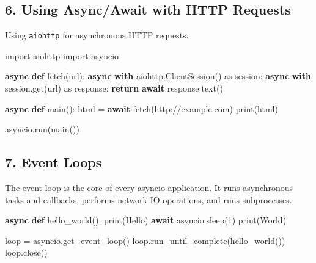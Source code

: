 \documentclass[
  letterpaper,
  DIV=11,
  numbers=noendperiod]{scrreprt}
\newenvironment{Shaded}{\begin{snugshade}}{\end{snugshade}}
\newcommand{\BuiltInTok}[1]{\textcolor[rgb]{0.00,0.23,0.31}{#1}}
\newcommand{\ControlFlowTok}[1]{\textcolor[rgb]{0.00,0.23,0.31}{\textbf{#1}}}
\newcommand{\DecValTok}[1]{\textcolor[rgb]{0.68,0.00,0.00}{#1}}
\newcommand{\ImportTok}[1]{\textcolor[rgb]{0.00,0.46,0.62}{#1}}
\newcommand{\KeywordTok}[1]{\textcolor[rgb]{0.00,0.23,0.31}{\textbf{#1}}}
\newcommand{\NormalTok}[1]{\textcolor[rgb]{0.00,0.23,0.31}{#1}}
\newcommand{\OperatorTok}[1]{\textcolor[rgb]{0.37,0.37,0.37}{#1}}
\newcommand{\StringTok}[1]{\textcolor[rgb]{0.13,0.47,0.30}{#1}}
\begin{document}
\subsection{6. Using Async/Await with HTTP
Requests}\label{using-asyncawait-with-http-requests}

Using \texttt{aiohttp} for asynchronous HTTP requests.

\begin{Shaded}
\begin{Highlighting}[]
\ImportTok{import}\NormalTok{ aiohttp}
\ImportTok{import}\NormalTok{ asyncio}

\ControlFlowTok{async} \KeywordTok{def}\NormalTok{ fetch(url):}
    \ControlFlowTok{async} \ControlFlowTok{with}\NormalTok{ aiohttp.ClientSession() }\ImportTok{as}\NormalTok{ session:}
        \ControlFlowTok{async} \ControlFlowTok{with}\NormalTok{ session.get(url) }\ImportTok{as}\NormalTok{ response:}
            \ControlFlowTok{return} \ControlFlowTok{await}\NormalTok{ response.text()}

\ControlFlowTok{async} \KeywordTok{def}\NormalTok{ main():}
\NormalTok{    html }\OperatorTok{=} \ControlFlowTok{await}\NormalTok{ fetch(}\StringTok{\textquotesingle{}http://example.com\textquotesingle{}}\NormalTok{)}
    \BuiltInTok{print}\NormalTok{(html)}

\NormalTok{asyncio.run(main())}
\end{Highlighting}
\end{Shaded}

\subsection{7. Event Loops}\label{event-loops}

The event loop is the core of every asyncio application. It runs
asynchronous tasks and callbacks, performs network IO operations, and
runs subprocesses.

\begin{Shaded}
\begin{Highlighting}[]
\ControlFlowTok{async} \KeywordTok{def}\NormalTok{ hello\_world():}
    \BuiltInTok{print}\NormalTok{(}\StringTok{\textquotesingle{}Hello\textquotesingle{}}\NormalTok{)}
    \ControlFlowTok{await}\NormalTok{ asyncio.sleep(}\DecValTok{1}\NormalTok{)}
    \BuiltInTok{print}\NormalTok{(}\StringTok{\textquotesingle{}World\textquotesingle{}}\NormalTok{)}

\NormalTok{loop }\OperatorTok{=}\NormalTok{ asyncio.get\_event\_loop()}
\NormalTok{loop.run\_until\_complete(hello\_world())}
\NormalTok{loop.close()}
\end{Highlighting}
\end{Shaded}
\end{document}
